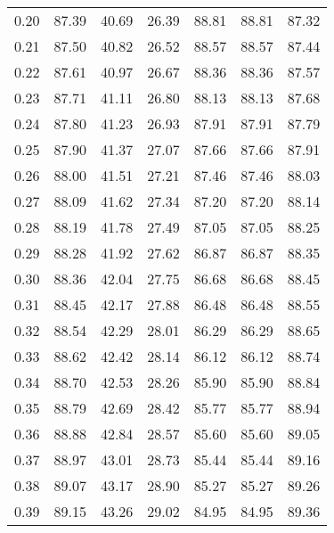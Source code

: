 \begin{tabular}{|c|c|c|c|c|c|c|}
      0.20 &     87.39 &     40.69 &      26.39 &   88.81 &      88.81 &         87.32 \\
      0.21 &     87.50 &     40.82 &      26.52 &   88.57 &      88.57 &         87.44 \\
      0.22 &     87.61 &     40.97 &      26.67 &   88.36 &      88.36 &         87.57 \\
      0.23 &     87.71 &     41.11 &      26.80 &   88.13 &      88.13 &         87.68 \\
      0.24 &     87.80 &     41.23 &      26.93 &   87.91 &      87.91 &         87.79 \\
      0.25 &     87.90 &     41.37 &      27.07 &   87.66 &      87.66 &         87.91 \\
      0.26 &     88.00 &     41.51 &      27.21 &   87.46 &      87.46 &         88.03 \\
      0.27 &     88.09 &     41.62 &      27.34 &   87.20 &      87.20 &         88.14 \\
      0.28 &     88.19 &     41.78 &      27.49 &   87.05 &      87.05 &         88.25 \\
      0.29 &     88.28 &     41.92 &      27.62 &   86.87 &      86.87 &         88.35 \\
      0.30 &     88.36 &     42.04 &      27.75 &   86.68 &      86.68 &         88.45 \\
      0.31 &     88.45 &     42.17 &      27.88 &   86.48 &      86.48 &         88.55 \\
      0.32 &     88.54 &     42.29 &      28.01 &   86.29 &      86.29 &         88.65 \\
      0.33 &     88.62 &     42.42 &      28.14 &   86.12 &      86.12 &         88.74 \\
      0.34 &     88.70 &     42.53 &      28.26 &   85.90 &      85.90 &         88.84 \\
      0.35 &     88.79 &     42.69 &      28.42 &   85.77 &      85.77 &         88.94 \\
      0.36 &     88.88 &     42.84 &      28.57 &   85.60 &      85.60 &         89.05 \\
      0.37 &     88.97 &     43.01 &      28.73 &   85.44 &      85.44 &         89.16 \\
      0.38 &     89.07 &     43.17 &      28.90 &   85.27 &      85.27 &         89.26 \\
      0.39 &     89.15 &     43.26 &      29.02 &   84.95 &      84.95 &         89.36 \\

\end{tabular}
